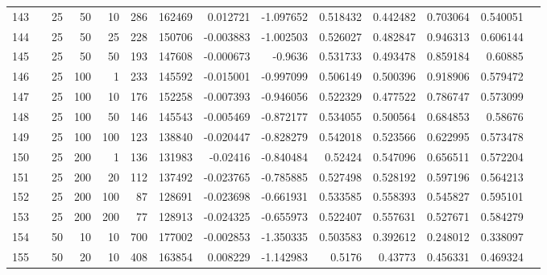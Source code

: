 \begin{longtable}{llrrrrrrrrrrrr}
		143 & &           25 &                50 &           10 &         286 &     162469 &  0.012721 & -1.097652 &  0.518432 &    0.442482 &       0.703064 &  0.540051 \\
		144 & &           25 &                50 &           25 &         228 &     150706 & -0.003883 & -1.002503 &  0.526027 &    0.482847 &       0.946313 &  0.606144 \\
		145 & &           25 &                50 &           50 &         193 &     147608 & -0.000673 &   -0.9636 &  0.531733 &    0.493478 &       0.859184 &   0.60885 \\
		146 & &           25 &               100 &            1 &         233 &     145592 & -0.015001 & -0.997099 &  0.506149 &    0.500396 &       0.918906 &  0.579472 \\
		147 & &           25 &               100 &           10 &         176 &     152258 & -0.007393 & -0.946056 &  0.522329 &    0.477522 &       0.786747 &  0.573099 \\
		148 & &           25 &               100 &           50 &         146 &     145543 & -0.005469 & -0.872177 &  0.534055 &    0.500564 &       0.684853 &   0.58676 \\
		149 & &           25 &               100 &          100 &         123 &     138840 & -0.020447 & -0.828279 &  0.542018 &    0.523566 &       0.622995 &  0.573478 \\
		150 & &           25 &               200 &            1 &         136 &     131983 &  -0.02416 & -0.840484 &   0.52424 &    0.547096 &       0.656511 &  0.572204 \\
		151 & &           25 &               200 &           20 &         112 &     137492 & -0.023765 & -0.785885 &  0.527498 &    0.528192 &       0.597196 &  0.564213 \\
		152 & &           25 &               200 &          100 &          87 &     128691 & -0.023698 & -0.661931 &  0.533585 &    0.558393 &       0.545827 &  0.595101 \\
		153 & &           25 &               200 &          200 &          77 &     128913 & -0.024325 & -0.655973 &  0.522407 &    0.557631 &       0.527671 &  0.584279 \\
		154 & &           50 &                10 &           10 &         700 &     177002 & -0.002853 & -1.350335 &  0.503583 &    0.392612 &       0.248012 &  0.338097 \\
		155 & &           50 &                20 &           10 &         408 &     163854 &  0.008229 & -1.142983 &    0.5176 &     0.43773 &       0.456331 &  0.469324 \\

\end{longtable}

